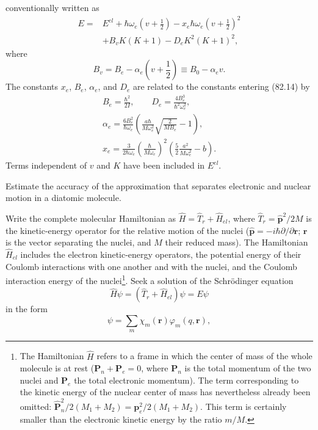 conventionally written as
\begin{equation}\begin{split}E={}&E^{el}+\hbar\omega_e\left(v+\frac12\right)-x_e\hbar\omega_e\left(v+\frac12\right)^2\\&+B_vK(K+1)-D_eK^2(K+1)^2,\end{split}\tag{82.14}\end{equation}
where
\begin{equation}B_v=B_e-\alpha_e\left(v+\frac12\right)\equiv B_0-\alpha_ev.\tag{82.15}\end{equation}
The constants $x_e$, $B_e$, $\alpha_e$, and $D_e$ are related to the constants entering (82.14) by
\begin{equation}\begin{gathered}B_e=\frac{\hbar^2}{2I},\qquad D_e=\frac{4B_e^3}{\hbar^2\omega_e^2},\\
\alpha_e=\frac{6B_e^2}{\hbar\omega_e}\left(\frac{a\hbar}{M\omega_e^2}\sqrt{\frac2{MB_e}}-1\right),\\
x_e=\frac3{2\hbar\omega_e}\left(\frac{\hbar}{M\omega_e}\right)^2\left(\frac52\frac{a^2}{M\omega_e^2}-b\right).
\end{gathered}\tag{82.16}\end{equation}
Terms independent of $v$ and $K$ have been included in $E^{el}$.

\ProblemHeading Estimate the accuracy of the approximation that separates electronic and nuclear motion in a diatomic molecule.

\SolutionHeading Write the complete molecular Hamiltonian as $\widehat H=\widehat T_r+\widehat H_{el}$, where $\widehat T_r=\widehat{\mathbf p}^{2}/2M$ is the kinetic-energy operator for the relative motion of the nuclei ($\widehat{\mathbf p}=-i\hbar\partial/\partial\mathbf r$; $\mathbf r$ is the vector separating the nuclei, and $M$ their reduced mass). The Hamiltonian $\widehat H_{el}$ includes the electron kinetic-energy operators, the potential energy of their Coulomb interactions with one another and with the nuclei, and the Coulomb interaction energy of the nuclei\footnote{The Hamiltonian $\widehat H$ refers to a frame in which the center of mass of the whole molecule is at rest ($\mathbf P_n+\mathbf P_e=0$, where $\mathbf P_n$ is the total momentum of the two nuclei and $\mathbf P_e$ the total electronic momentum). The term corresponding to the kinetic energy of the nuclear center of mass has nevertheless already been omitted: $\widehat{\mathbf P}_n^{2}/2(M_1+M_2)=\mathbf p_e^2/2(M_1+M_2)$. This term is certainly smaller than the electronic kinetic energy by the ratio $m/M$.}. Seek a solution of the Schrödinger equation
\begin{equation}\widehat H\psi=(\widehat T_r+\widehat H_{el})\psi=E\psi\tag{1}\end{equation}
in the form
\begin{equation}\psi=\sum_m\chi_m(\mathbf r)\varphi_m(q,\mathbf r),\tag{2}\end{equation}

